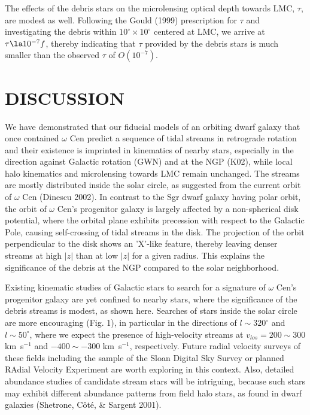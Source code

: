 \documentclass[preprint,12pt]{aastex}
\begin{document}
The effects of the debris stars on the microlensing optical depth towards LMC,
$\tau$, are modest as well. Following the Gould (1999) prescription for $\tau$
and investigating the debris within $10^\circ \times 10^\circ$
centered at LMC, we arrive at $\tau \la 10^{-7}f$, thereby indicating
that $\tau$ provided by the debris stars is much smaller than the observed
$\tau$ of $O(10^{-7})$.


\section{DISCUSSION}

We have demonstrated that our fiducial models of an orbiting dwarf galaxy
that once contained $\omega$ Cen predict a sequence of tidal streams
in retrograde rotation and their existence is imprinted in kinematics of
nearby stars, especially in the direction against Galactic rotation (GWN) and
at the NGP (K02), while local halo kinematics and microlensing towards LMC
remain unchanged. The streams are mostly distributed
inside the solar circle, as suggested from the current orbit of
$\omega$ Cen (Dinescu 2002).
In contrast to the Sgr dwarf galaxy having polar orbit,
the orbit of $\omega$ Cen's progenitor galaxy is
largely affected by a non-spherical disk potential, where the orbital plane
exhibits precession with respect to the Galactic Pole, causing self-crossing
of tidal streams in the disk. The projection of the orbit
perpendicular to the disk shows an 'X'-like feature, thereby leaving
denser streams at high $|z|$ than at low $|z|$ for a given radius.
This explains the significance of the debris at the NGP
compared to the solar neighborhood.

Existing kinematic studies of Galactic stars to search for a signature
of $\omega$ Cen's progenitor galaxy are yet confined to nearby stars,
where the significance of the debris streams is modest, as shown here.
Searches of stars inside the solar circle are more encouraging (Fig. 1),
in particular in the directions of $l \sim 320^\circ$ and $l \sim 50^\circ$,
where we expect the presence of high-velocity streams at
$v_{los} = 200 \sim 300$ km~s$^{-1}$ and $-400 \sim -300$ km~s$^{-1}$,
respectively. Future radial velocity surveys of these fields including the
sample of the Sloan Digital Sky Survey or planned RAdial Velocity
Experiment are worth exploring in this context. Also, detailed
abundance studies of candidate stream stars will be intriguing, because such
stars may exhibit different abundance patterns from field halo stars,
as found in dwarf galaxies (Shetrone, C\^{o}t\'{e}, \& Sargent 2001).
\end{document}
